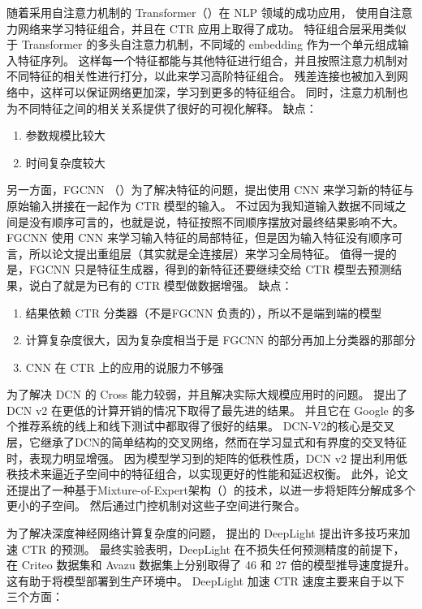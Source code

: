 \documentclass[degree=project,degree-type=project,cjk-font=noto]{thuthesis}
\begin{document}
随着采用自注意力机制的 Transformer（\cite{self_attention}）在 NLP 领域的成功应用，\cite{autoint} 使用自注意力网络来学习特征组合，并且在 CTR 应用上取得了成功。
特征组合层采用类似于 Transformer 的多头自注意力机制，不同域的 embedding 作为一个单元组成输入特征序列。
这样每一个特征都能与其他特征进行组合，并且按照注意力机制对不同特征的相关性进行打分，以此来学习高阶特征组合。
残差连接也被加入到网络中，这样可以保证网络更加深，学习到更多的特征组合。
同时，注意力机制也为不同特征之间的相关关系提供了很好的可视化解释。
缺点：

\begin{enumerate}
  \item 参数规模比较大
  \item 时间复杂度较大
\end{enumerate}

另一方面，FGCNN （\cite{fgcnn}）为了解决特征的问题，提出使用 CNN 来学习新的特征与原始输入拼接在一起作为 CTR 模型的输入。
不过因为我知道输入数据不同域之间是没有顺序可言的，也就是说，特征按照不同顺序摆放对最终结果影响不大。
FGCNN 使用 CNN 来学习输入特征的局部特征，但是因为输入特征没有顺序可言，所以论文提出重组层（其实就是全连接层）来学习全局特征。
值得一提的是，FGCNN 只是特征生成器，得到的新特征还要继续交给 CTR 模型去预测结果，说白了就是为已有的 CTR 模型做数据增强。
缺点：

\begin{enumerate}
  \item 结果依赖 CTR 分类器（不是FGCNN 负责的），所以不是端到端的模型
  \item 计算复杂度很大，因为复杂度相当于是 FGCNN 的部分再加上分类器的那部分
  \item CNN 在 CTR 上的应用的说服力不够强
\end{enumerate}

为了解决 DCN 的 Cross 能力较弱，并且解决实际大规模应用时的问题。
\cite{dcn_v2} 提出了 DCN v2 在更低的计算开销的情况下取得了最先进的结果。
并且它在 Google 的多个推荐系统的线上和线下测试中都取得了很好的结果。
DCN-V2的核心是交叉层，它继承了DCN的简单结构的交叉网络，然而在学习显式和有界度的交叉特征时，表现力明显增强。
因为模型学习到的矩阵的低秩性质，DCN v2 提出利用低秩技术来逼近子空间中的特征组合，以实现更好的性能和延迟权衡。
此外，论文还提出了一种基于Mixture-of-Expert架构（\cite{mix_experts}）的技术，以进一步将矩阵分解成多个更小的子空间。
然后通过门控机制对这些子空间进行聚合。


为了解决深度神经网络计算复杂度的问题，\cite{deeplight} 提出的 DeepLight 提出许多技巧来加速 CTR 的预测。
最终实验表明，DeepLight 在不损失任何预测精度的前提下，在 Criteo 数据集和 Avazu 数据集上分别取得了 46 和 27 倍的模型推导速度提升。
这有助于将模型部署到生产环境中。
DeepLight 加速 CTR 速度主要来自于以下三个方面：
\end{document}

